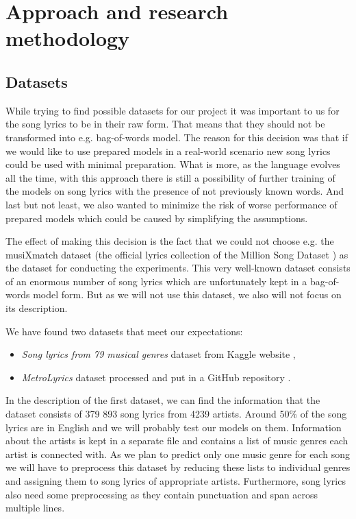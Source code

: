 \section{Approach and research methodology}

\subsection{Datasets}
While trying to find possible datasets for our project it was important to us for the song lyrics to be in their raw form. That means that they should not be transformed into e.g. bag-of-words model. The reason for this decision was that if we would like to use prepared models in a real-world scenario new song lyrics could be used with minimal preparation. What is more, as the language evolves all the time, with this approach there is still a possibility of further training of the models on song lyrics with the presence of not previously known words. And last but not least, we also wanted to minimize the risk of worse performance of prepared models which could be caused by simplifying the assumptions.

The effect of making this decision is the fact that we could not choose e.g. the musiXmatch dataset (the official lyrics collection of the Million Song Dataset \cite{Bertin-Mahieux2011}) as the dataset for conducting the experiments. This very well-known dataset consists of an enormous number of song lyrics which are unfortunately kept in a bag-of-words model form. But as we will not use this dataset, we also will not focus on its description.

We have found two datasets that meet our expectations:
\begin{itemize}
    \item \textit{Song lyrics from 79 musical genres} dataset from Kaggle website \cite{KaggleDataset},
    \item \textit{MetroLyrics} dataset processed and put in a GitHub repository \cite{GithubDataset}.
\end{itemize}

In the description of the first dataset, we can find the information that the dataset consists of 379 893 song lyrics from 4239 artists. Around 50\% of the song lyrics are in English and we will probably test our models on them. Information about the artists is kept in a separate file and contains a list of music genres each artist is connected with. As we plan to predict only one music genre for each song we will have to preprocess this dataset by reducing these lists to individual genres and assigning them to song lyrics of appropriate artists. Furthermore, song lyrics also need some preprocessing as they contain punctuation and span across multiple lines.

